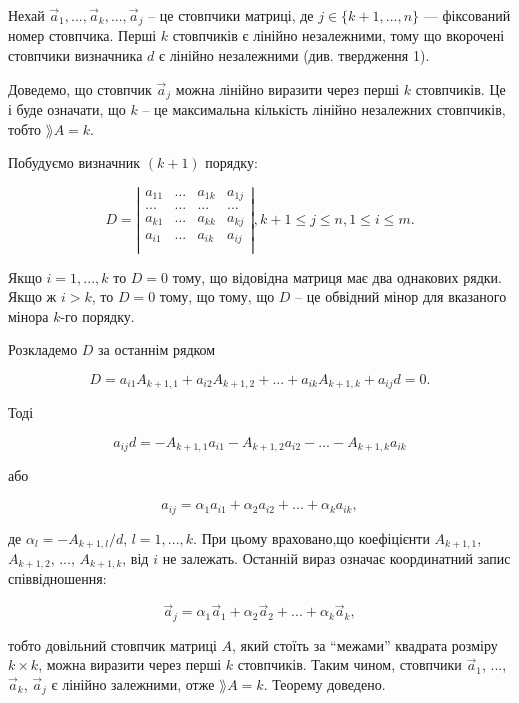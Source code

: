 Нехай $\overrightarrow{a}_1, ...,\overrightarrow{a}_k, ..., \overrightarrow{a}_j$ -- це
стовпчики матриці, де $j \in \{k+1, ..., n\}$ ---
фіксований номер стовпчика. Перші $k$ стовпчиків є лінійно незалежними, тому що
вкорочені стовпчики визначника $d$ є лінійно незалежними (див. твердження 1).

Доведемо, що стовпчик $\overrightarrow{a}_j$ можна лінійно виразити через перші $k$ стовпчиків.
Це і буде означати, що $k$ -- це максимальна кількість лінійно незалежних
стовпчиків, тобто $\rang A = k$.


Побудуємо визначник $(k + 1)$ порядку:

$$D = \left| \begin{matrix}
	a_{11} & ... & a_{1k} & a_{1j} \\
	...    & ... & ...    & ...    \\
	a_{k1} & ... & a_{kk} & a_{kj} \\
	a_{i1} & ... & a_{ik} & a_{ij} \\
\end{matrix} \right|, k+1 \leqslant j \leqslant n, 1 \leqslant i \leqslant m.$$


Якщо $i = 1, ..., k$ то $D = 0$ тому, що відовідна матриця має два однакових
рядки. Якщо ж $i > k$, то $D = 0$ тому, що тому, що $D$ -- це обвідний мінор для
вказаного мінора $k$-го порядку.

Розкладемо $D$ за останнім рядком

$$D = a_{i1} A_{k+1, 1} + a_{i2} A_{k+1, 2} + ... + a_{ik} A_{k+1, k} + a_{ij} d = 0.$$

Тоді

$$a_{ij} d = -A_{k+1,1} a_{i1} -A_{k+1,2} a_{i2} -... -A_{k+1,k} a_{ik}$$

або

$$a_{ij} = \alpha_1 a_{i1} + \alpha_2 a_{i2} + ... + \alpha_k a_{ik},$$

де $\alpha_l = -A_{k+1,l}/d$, $l = 1, ..., k$. При цьому враховано,що коефіцієнти $A_{k+1,1}$, $A_{k+1,2}$, ...,
$A_{k+1,k}$, від $i$ не залежать. Останній вираз означає координатний запис
співвідношення:

$$\overrightarrow{a}_{j} = \alpha_1 \overrightarrow{a}_1 + \alpha_2 \overrightarrow{a}_2 + ... + \alpha_k \overrightarrow{a}_k,$$


тобто довільний стовпчик матриці $A$, який стоїть за “межами” квадрата розміру
$k \times k$, можна виразити через перші $k$ стовпчиків. Таким чином, стовпчики $\overrightarrow{a}_1$, ...,
$\overrightarrow{a}_k$, $\overrightarrow{a}_j$ є лінійно залежними, отже $\rang A = k$. Теорему доведено.



